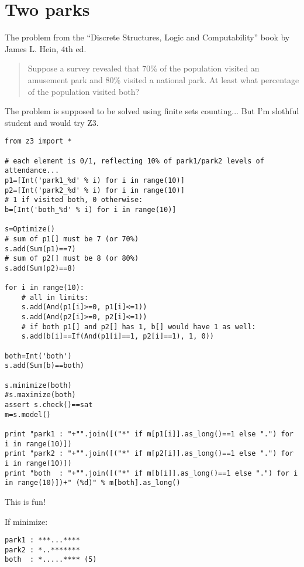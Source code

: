 \section{Two parks}

The problem from the ``Discrete Structures, Logic and Computability'' book by James L. Hein, 4th ed.

\begin{framed}
\begin{quotation}

Suppose a survey revealed that 70\% of the population visited
an amusement park and 80\% visited a national park.
At least what percentage of the population visited both?

\end{quotation}
\end{framed}

The problem is supposed to be solved using finite sets counting...
But I'm slothful student and would try Z3.

\begin{lstlisting}[style=custompy]
from z3 import *

# each element is 0/1, reflecting 10% of park1/park2 levels of attendance...
p1=[Int('park1_%d' % i) for i in range(10)]
p2=[Int('park2_%d' % i) for i in range(10)]
# 1 if visited both, 0 otherwise:
b=[Int('both_%d' % i) for i in range(10)]

s=Optimize()
# sum of p1[] must be 7 (or 70%)
s.add(Sum(p1)==7)
# sum of p2[] must be 8 (or 80%)
s.add(Sum(p2)==8)

for i in range(10):
    # all in limits:
    s.add(And(p1[i]>=0, p1[i]<=1))
    s.add(And(p2[i]>=0, p2[i]<=1))
    # if both p1[] and p2[] has 1, b[] would have 1 as well:
    s.add(b[i]==If(And(p1[i]==1, p2[i]==1), 1, 0))

both=Int('both')
s.add(Sum(b)==both)

s.minimize(both)
#s.maximize(both)
assert s.check()==sat
m=s.model()

print "park1 : "+"".join([("*" if m[p1[i]].as_long()==1 else ".") for i in range(10)])
print "park2 : "+"".join([("*" if m[p2[i]].as_long()==1 else ".") for i in range(10)])
print "both  : "+"".join([("*" if m[b[i]].as_long()==1 else ".") for i in range(10)])+" (%d)" % m[both].as_long()
\end{lstlisting}

This is fun!

If minimize:

\begin{lstlisting}
park1 : ***...****
park2 : *..*******
both  : *.....**** (5)
\end{lstlisting}

